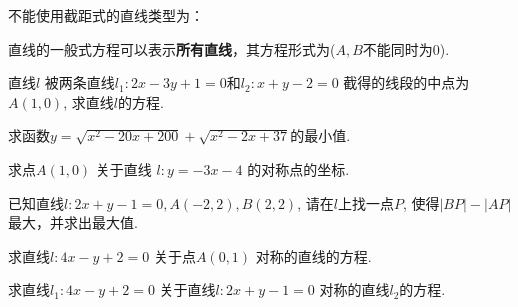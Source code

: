 \documentclass{book}
\begin{document}
\begin{Exercise}
          \begin{minipage}{0.45\textwidth}
            不能使用截距式的直线类型为：
          \end{minipage}
          \begin{minipage}{0.2\textwidth}
          \end{minipage}
          \begin{minipage}{0.2\textwidth}
          \end{minipage}
          \begin{minipage}{0.15\textwidth}
          \end{minipage}

          直线的一般式方程可以表示\textbf{所有直线}，其方程形式为\underline{\hspace{72pt}}($A,B$不能同时为$0$).

      \end{Exercise}

      \begin{Exercise}

        \Question 直线$l$ 被两条直线$l_1:2x-3y+1=0$和$l_2:x+y-2=0$ 截得的线段的中点为$A(1,0)$, 求直线$l$的方程. \vspace{2cm}
        \newpage

        \Question 求函数$ y=\sqrt{x^2-20x+200}+\sqrt{x^2-2x+37} $的最小值. \vspace{3.5cm}

        \Question 求点$A(1,0)$ 关于直线 $ l:y=-3x-4 $ 的对称点的坐标. \vspace{3.5cm}

        \Question 已知直线$l:2x+y-1=0, A(-2,2), B(2,2)$, 请在$l$上找一点$P$, 使得$|BP|-|AP|$最大，并求出最大值. \vspace{3.5cm}

        \Question 求直线$l:4x-y+2=0$ 关于点$A(0,1)$ 对称的直线的方程. \vspace{3.5cm}

        \Question 求直线$l_1:4x-y+2=0$ 关于直线$l:2x+y-1=0$ 对称的直线$l_2$的方程.

      \end{Exercise}
\end{document}
